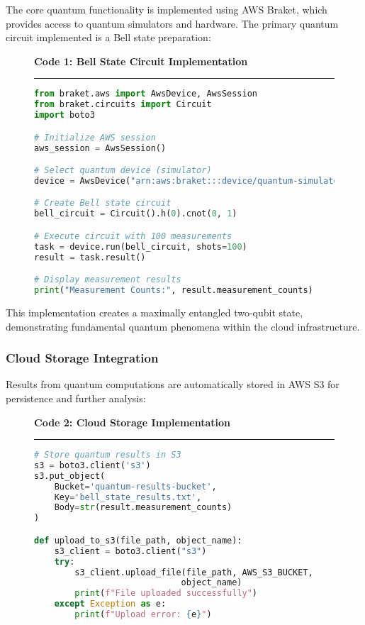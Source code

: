 \documentclass[onecolumn]{IEEEtran}
\begin{document}
The core quantum functionality is implemented using AWS Braket, which provides access to quantum simulators and hardware. The primary quantum circuit implemented is a Bell state preparation:

\begin{figure}[h]
\centering
\setlength{\fboxsep}{8pt}
\textbf{Code 1: Bell State Circuit Implementation}
\vspace{3pt}
\hrule
\vspace{3pt}
\begin{lstlisting}[language=Python, basicstyle=\ttfamily\scriptsize, breaklines=true]
from braket.aws import AwsDevice, AwsSession
from braket.circuits import Circuit
import boto3

# Initialize AWS session
aws_session = AwsSession()

# Select quantum device (simulator)
device = AwsDevice("arn:aws:braket:::device/quantum-simulator/amazon/sv1")

# Create Bell state circuit
bell_circuit = Circuit().h(0).cnot(0, 1)

# Execute circuit with 100 measurements
task = device.run(bell_circuit, shots=100)
result = task.result()

# Display measurement results
print("Measurement Counts:", result.measurement_counts)
\end{lstlisting}
\end{figure}

This implementation creates a maximally entangled two-qubit state, demonstrating fundamental quantum phenomena within the cloud infrastructure.

\subsubsection{Cloud Storage Integration}

Results from quantum computations are automatically stored in AWS S3 for persistence and further analysis:

\begin{figure}[h]
\centering
\setlength{\fboxsep}{8pt}
\textbf{Code 2: Cloud Storage Implementation}
\vspace{3pt}
\hrule
\vspace{3pt}
\begin{lstlisting}[language=Python, basicstyle=\ttfamily\scriptsize, breaklines=true]
# Store quantum results in S3
s3 = boto3.client('s3')
s3.put_object(
    Bucket='quantum-results-bucket',
    Key='bell_state_results.txt',
    Body=str(result.measurement_counts)
)

def upload_to_s3(file_path, object_name):
    s3_client = boto3.client("s3")
    try:
        s3_client.upload_file(file_path, AWS_S3_BUCKET, 
                             object_name)
        print(f"File uploaded successfully")
    except Exception as e:
        print(f"Upload error: {e}")
\end{lstlisting}
\end{figure}
\end{document}
